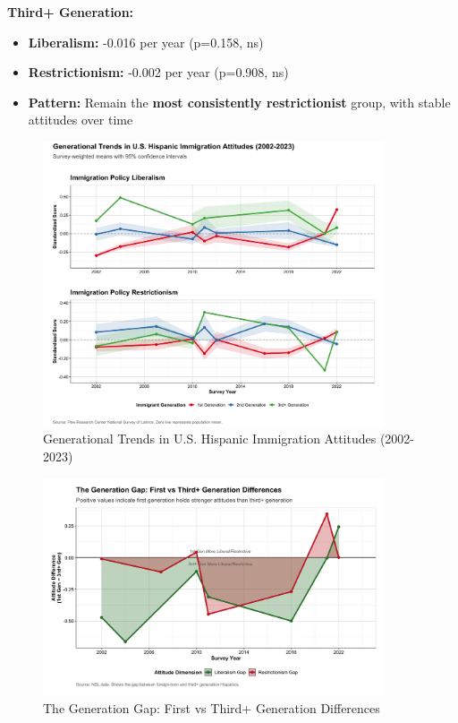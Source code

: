 \documentclass[11pt,letterpaper]{article}
\begin{document}
\textbf{Third+ Generation:}
\begin{itemize}
    \item \textbf{Liberalism:} -0.016 per year (p=0.158, ns)
    \item \textbf{Restrictionism:} -0.002 per year (p=0.908, ns)
    \item \textbf{Pattern:} Remain the \textbf{most consistently restrictionist} group, with stable attitudes over time
\end{itemize}

\begin{figure}[H]
    \centering
    \includegraphics[width=0.9\textwidth]{../../outputs/figure_v4_4_main_generation_trends.png}
    \caption{Generational Trends in U.S. Hispanic Immigration Attitudes (2002-2023)}
    \label{fig:main_trends}
\end{figure}

\begin{figure}[H]
    \centering
    \includegraphics[width=0.9\textwidth]{../../outputs/figure_v4_4_generation_gap.png}
    \caption{The Generation Gap: First vs Third+ Generation Differences}
    \label{fig:generation_gap}
\end{figure}
\end{document}
